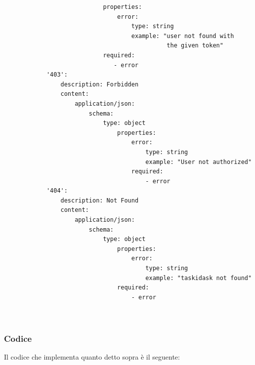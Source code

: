 \documentclass{report}
\begin{document}
\begin{verbatim}
                            properties:
                                error:
                                    type: string
                                    example: "user not found with
                                              the given token"
                            required:
                               - error
            '403':
                description: Forbidden
                content:
                    application/json:
                        schema:
                            type: object
                                properties:
                                    error:
                                        type: string
                                        example: "User not authorized"
                                    required:
                                        - error
            '404':
                description: Not Found
                content:
                    application/json:
                        schema:
                            type: object
                                properties:
                                    error:
                                        type: string
                                        example: "taskidask not found"
                                required:
                                    - error
	
	
\end{verbatim}

\subsubsection*{Codice}

Il codice che implementa quanto detto sopra è il seguente:
\end{document}
